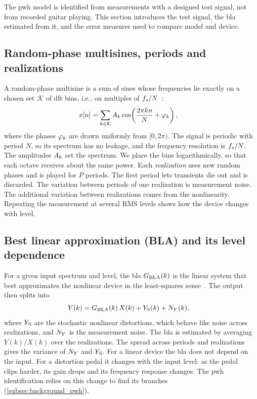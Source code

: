 The \gls{pwh} model is identified from measurements with a designed test signal, not from recorded guitar playing. This section introduces the test signal, the \gls{bla} estimated from it, and the error measures used to compare model and device.


\subsection{Random-phase multisines, periods and realizations}
\label{subsec:background_multisines}

A random-phase multisine is a sum of sines whose frequencies lie exactly on a chosen set $\mathcal{K}$ of \acrfull{dft} bins, i.e., on multiples of $f\sb{s}/N$~\cite{pintelon2012sysid}:
\begin{equation}
  x[n] = \sum\sb{k \in \mathcal{K}} A\sb{k} \cos\!\left(\frac{2\pi k n}{N} + \varphi\sb{k}\right),
  \label{eq:multisine}
\end{equation}
where the phases $\varphi\sb k$ are drawn uniformly from $[0, 2\pi)$. The signal is periodic with period $N$, so its spectrum has no leakage, and the frequency resolution is $f\sb{s}/N$. The amplitudes $A\sb{k}$ set the spectrum. We place the bins logarithmically, so that each octave receives about the same power. Each \emph{realization} uses new random phases and is played for $P$ periods. The first period lets transients die out and is discarded. The variation between periods of one realization is measurement noise. The additional variation between realizations comes from the nonlinearity. Repeating the measurement at several RMS levels shows how the device changes with level.

\subsection{Best linear approximation (BLA) and its level dependence}
\label{subsec:background_bla}

For a given input spectrum and level, the \gls{bla} $G\sb{\mathrm{BLA}}(k)$ is the linear system that best approximates the nonlinear device in the least-squares sense~\cite{pintelon2012sysid}. The output then splits into
\begin{equation}
  Y(k) = G\sb{\mathrm{BLA}}(k)\, X(k) + Y\sb{\mathrm{S}}(k) + N\sb{Y}(k),
  \label{eq:bla}
\end{equation}
where $Y\sb{\mathrm{S}}$ are the stochastic nonlinear distortions, which behave like noise across realizations, and $N\sb{Y}$ is the measurement noise. The \gls{bla} is estimated by averaging $Y(k)/X(k)$ over the realizations. The spread across periods and realizations gives the variance of $N\sb{Y}$ and $Y\sb{\mathrm{S}}$. For a linear device the \gls{bla} does not depend on the input. For a distortion pedal it changes with the input level: as the pedal clips harder, its gain drops and its frequency response changes. The \gls{pwh} identification relies on this change to find its branches (\cref{subsec:background_pwh}).


